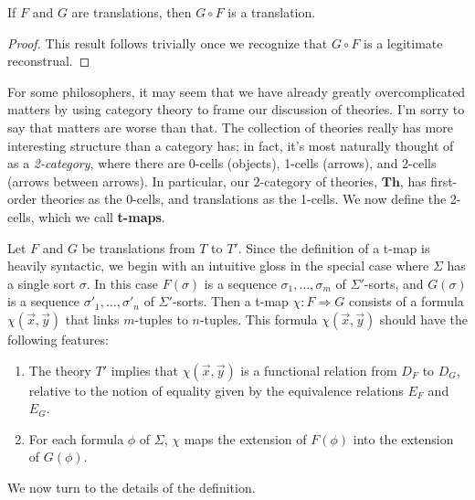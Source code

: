
 \begin{prop} If $F$ and $G$ are translations, then $G\circ F$ is a
   translation. \end{prop}

 \begin{proof} This result follows trivially once we recognize that
   $G\circ F$ is a legitimate reconstrual.  \end{proof}


 For some philosophers, it may seem that we have already greatly
 overcomplicated matters by using category theory to frame our
 discussion of theories.  I'm sorry to say that matters are worse than
 that.  The collection of theories really has more interesting
 structure than a category has; in fact, it's most naturally thought
 of as a \emph{2-category}, where there are 0-cells (objects), 1-cells
 (arrows), and 2-cells (arrows between arrows).  In particular, our
 $2$-category of theories, $\mathbf{Th}$, has first-order theories as
 the 0-cells, and translations as the 1-cells.  We now define the
 2-cells, which we call \textbf{t-maps}.  

Let $F$ and $G$ be translations from $T$ to $T'$.  Since the
definition of a t-map is heavily syntactic, we begin with an intuitive
gloss in the special case where $\Sigma$ has a single sort $\sigma$.
In this case $F(\sigma )$ is a sequence $\sigma _1,\dots ,\sigma _m$
of $\Sigma '$-sorts, and $G(\sigma )$ is a sequence
$\sigma '_1,\dots ,\sigma '_n$ of $\Sigma '$-sorts.  Then a t-map
$\chi :F\Rightarrow G$ consists of a formula $\chi (\vec{x},\vec{y})$
that links $m$-tuples to $n$-tuples.  This formula
$\chi (\vec{x},\vec{y})$ should have the following features:
\begin{enumerate}
\item The theory $T'$ implies that $\chi (\vec{x},\vec{y})$ is a
  functional relation from $D_F$ to $D_G$, relative to the notion of
  equality given by the equivalence relations $E_F$ and $E_G$.
\item For each formula $\phi$ of $\Sigma$, $\chi$ maps the extension
  of $F(\phi )$ into the extension of $G(\phi )$.
\end{enumerate}
We now turn to the details of the definition.

